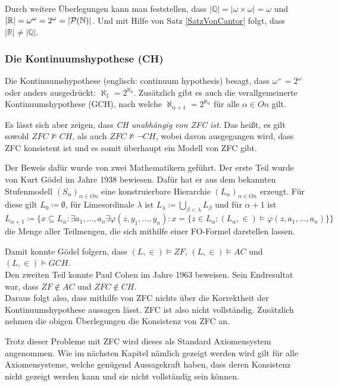 Durch weitere Überlegungen kann man feststellen, dass $\vert \mathbb{Q} \vert=\vert \omega\times\omega \vert = \omega$ und $\vert \mathbb{R} \vert = \omega^\omega = 2^\omega=\vert \mathcal{P}(\mathbb{N})\vert$. Und mit Hilfe von Satz \ref{SatzVonCantor} folgt, dass $\vert \mathbb{R} \vert \neq \vert \mathbb{Q} \vert$.

\subsubsection{Die Kontinuumshypothese (CH)}

Die Kontinuumshypothese (englisch: continuum hypothesis) besagt, dass $\omega^+=2^\omega$ oder anders ausgedrückt: $\aleph_1=2^{\aleph_0}$. Zusätzlich gibt es auch die verallgemeinerte Kontinuumshypothese (GCH), nach welche $\aleph_{\alpha+1}=2^{\aleph_\alpha}$ für alle $\alpha\in On$ gilt.
\par

Es lässt sich aber zeigen, dass \textit{CH unabhängig von ZFC ist}. Das heißt, es gilt sowohl $ZFC \not\models CH$, als auch $ZFC \not\models \neg CH$, wobei davon ausgegangen wird, dass ZFC konsistent ist und es somit überhaupt ein Modell von ZFC gibt.

Der Beweis dafür wurde von zwei Mathematikern geführt. Der erste Teil wurde von Kurt Gödel im Jahre 1938 bewiesen. Dafür hat er aus dem bekannten Stufenmodell $(S_\alpha)_{\alpha\in On}$ eine konstruierbare Hierarchie $(L_\alpha)_{\alpha\in On}$ erzeugt. Für diese gilt $L_0\coloneqq\emptyset$, für Limesordinale $\lambda$ ist $L_\lambda\coloneqq \bigcup_{\beta<\lambda}L_\beta$ und für $\alpha+1$ ist $L_{\alpha+1}\coloneqq\{x\subseteq L_\alpha : \exists a_1,\dots,a_n\exists\varphi(z,y_1,\dots,y_n) : x=\{z\in L_\alpha : (L_\alpha,\in) \models \varphi(z,a_1,\dots, a_n)\}\}$ die Menge aller Teilmengen, die sich mithilfe einer FO-Formel darstellen lassen.

Damit konnte Gödel folgern, dass $(L,\in)\models ZF$, $(L,\in)\models AC$ und $(L,\in)\models GCH$.
\\
Den zweiten Teil konnte Paul Cohen im Jahre 1963 beweisen. Sein Endresultat war, dass $ZF\notin AC$ und $ZFC \notin CH$.
\\

Daraus folgt also, dass mithilfe von ZFC nichts über die Korrektheit der Kontinuumshypothese aussagen lässt. ZFC ist also nicht vollständig. Zusätzlich nehmen die obigen Überlegungen die Konsistenz von ZFC an.

Trotz dieser Probleme mit ZFC wird dieses als \glqq Standard \grqq{} Axiomensystem angenommen. Wie im nächsten Kapitel nämlich gezeigt werden wird gilt für alle Axiomensysteme, welche genügend Aussagekraft haben, dass deren Konsistenz nicht gezeigt werden kann und sie nicht vollständig sein können.
